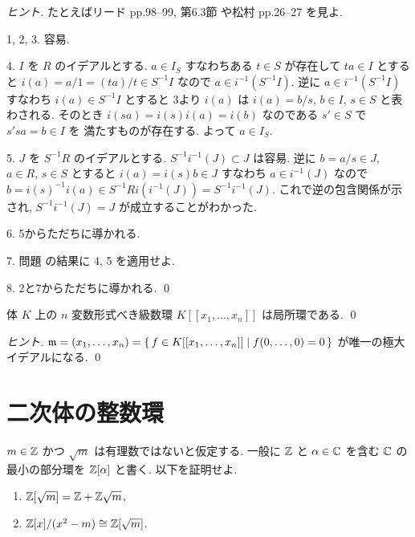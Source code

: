 \documentclass[12pt,twoside]{jarticle}
\begin{document}
\begin{proof}[ヒント]
 たとえばリード \cite{reid-1995-2000} pp.98--99, 第6.3節
 や松村 \cite{matsumura-1980-2000} pp.26--27 を見よ. 

 1, 2, 3. 容易.

 4. $I$ を $R$ のイデアルとする. 
 $a\in I_S$ すなわちある $t\in S$ が存在して $ta\in I$ とすると %
 $i(a)=a/1=(ta)/t\in S^{-1}I$ なので $a\in i^{-1}(S^{-1}I)$.
 逆に $a\in i^{-1}(S^{-1}I)$ すなわち $i(a)\in S^{-1}I$ とすると %
 3より $i(a)$ は $i(a)=b/s$, $b\in I$, $s\in S$ と表わされる.
 そのとき $i(sa)=i(s)i(a)=i(b)$ なのである $s'\in S$ で $s'sa=b\in I$ を
 満たすものが存在する. よって $a\in I_S$.

 5. $J$ を $S^{-1}R$ のイデアルとする. 
 $S^{-1}i^{-1}(J)\subset J$ は容易.
 逆に $b=a/s\in J$, $a\in R$, $s\in S$ とすると $i(a)=i(s)b\in J$ 
 すなわち $a\in i^{-1}(J)$ なので %
 $b=i(s)^{-1}i(a)\in S^{-1}Ri(i^{-1}(J))=S^{-1}i^{-1}(J)$.
 これで逆の包含関係が示され,  $S^{-1}i^{-1}(J)=J$ が成立することがわかった.

 6. 5からただちに導かれる.

 7. 問題  の結果に 4, 5 を適用せよ.

 8. 2と7からただちに導かれる.
 \qed
\end{proof}

\begin{question}[20点]
\label{q:K[[x1,...,xn]]-is-local}
 体 $K$ 上の $n$ 変数形式べき級数環 $K[[x_1,\ldots,x_n]]$ は局所環である.
 \qed
\end{question}

\begin{proof}[ヒント]
 \( {\mathfrak m}=(x_1,\ldots,x_n)
 =\{\, f\in K[[x_1,\ldots,x_n]] \mid f(0,\ldots,0)=0 \,\} \)
 が唯一の極大イデアルになる.
 \qed
\end{proof}


\section{二次体の整数環}

\begin{question}
 $m\in{\mathbb Z}$ かつ $\sqrt{m}$ は有理数ではないと仮定する.
 一般に ${\mathbb Z}$ と $\alpha\in{\mathbb C}$ を含む ${\mathbb C}$ の
 最小の部分環を ${\mathbb Z}[\alpha]$ と書く. 
 以下を証明せよ.
 \begin{enumerate}
  \item ${\mathbb Z}[\sqrt{m}] = {\mathbb Z} + {\mathbb Z}\sqrt{m}$,
  \item ${\mathbb Z}[x]/(x^2-m)\cong {\mathbb Z}[\sqrt{m}]$.
 \end{enumerate}
\end{question}
\end{document}

